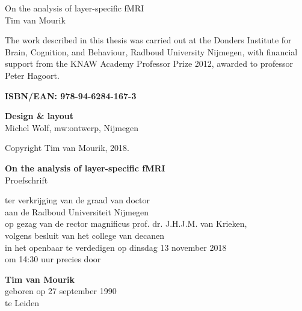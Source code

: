 \thispagestyle{empty}

{\setlength{\parindent}{0cm}
	\begin{flushright}
		\vspace{120pt}
		\huge{On the analysis of layer-specific fMRI}\\
		\vspace{80pt}
		\large{Tim van Mourik}
	\end{flushright}
}

\newpage

\thispagestyle{empty}
{\setlength{\parindent}{0cm}\raggedright\smaller
\null\vfill

The work described in this thesis was carried out at the Donders Institute for Brain, Cognition, and Behaviour, Radboud University Nijmegen, with financial support from the KNAW Academy Professor Prize 2012, awarded to professor Peter Hagoort.

\vspace{12pt}

\textbf{ISBN/EAN: 978-94-6284-167-3}

\vspace{12pt}
\textbf{Design \& layout}\\
Michel Wolf, mw:ontwerp, Nijmegen

\vspace{12pt}
Copyright {\textcopyright} Tim van Mourik, 2018. 
}

\newpage

\thispagestyle{empty}
\begin{minipage}[c]{100mm}

\begin{center}
\vspace{20pt}
\large{\textbf{On the analysis of layer-specific fMRI}}\\
\vspace{70pt}
\large{Proefschrift}\\
\vspace{60pt}

{
ter verkrijging van de graad van doctor \\ 
aan de Radboud Universiteit Nijmegen\\
op gezag van de rector magnificus prof. dr. J.H.J.M. van Krieken, \\
volgens besluit van het college van decanen\\ 
in het openbaar te verdedigen op dinsdag 13 november 2018\\ 
om 14:30 uur precies
}
\vspace{30pt}
door
\vspace{30pt}

{\textbf{Tim van Mourik}}\\
geboren op 27 september 1990\\
te Leiden
\end{center}

\end{minipage}
%
\newpage
\thispagestyle{empty}

